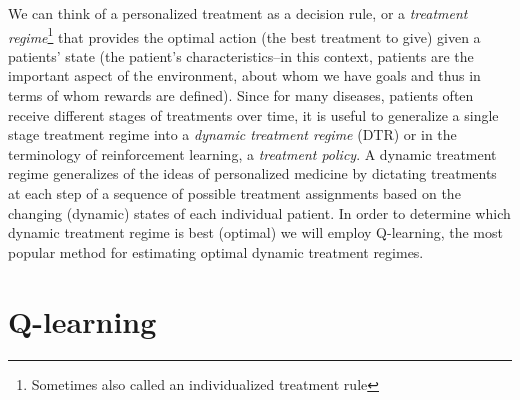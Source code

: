 \documentclass[12pt]{article}
\begin{document}
We can think of a personalized treatment as a decision rule, or a \emph{treatment regime}\footnote{Sometimes also called an individualized treatment rule} that provides the optimal action (the best treatment to give) given a patients' state (the patient's characteristics--in this context, patients are the important aspect of the environment, about whom we have goals and thus in terms of whom rewards are defined). Since for many diseases, patients often receive different stages of treatments over time, it is useful to generalize a single stage treatment regime into a \emph{dynamic treatment regime} (DTR) or in the terminology of reinforcement learning, a \emph{treatment policy}. A dynamic treatment regime generalizes of the ideas of personalized medicine by dictating treatments at each step of a sequence of possible treatment assignments based on the changing (dynamic) states of each individual patient. In order to determine which dynamic treatment regime is best (optimal) we will employ Q-learning, the most popular method for estimating optimal dynamic treatment regimes.



\section{Q-learning} %
\label{sec:q_learning}
\end{document}
